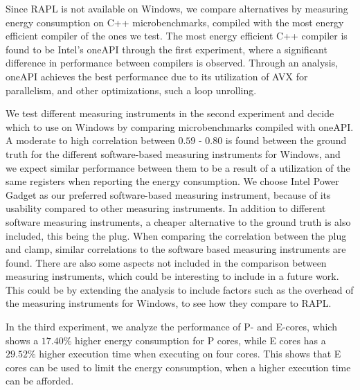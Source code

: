 Since RAPL is not available on Windows, we compare alternatives by measuring energy consumption on C++ microbenchmarks, compiled with the most energy efficient compiler of the ones we test. The most energy efficient C++ compiler is found to be Intel's oneAPI through the first experiment, where a significant difference in performance between compilers is observed. Through an analysis, oneAPI achieves the best performance due to its utilization of AVX for parallelism, and other optimizations, such a loop unrolling.


We test different measuring instruments in the second experiment and decide which to use on Windows by comparing microbenchmarks compiled with oneAPI. A moderate to high correlation between $0.59$ - $0.80$ is found between the ground truth for the different software-based measuring instruments for Windows, and we expect similar performance between them to be a result of a utilization of the same registers when reporting the energy consumption. We choose Intel Power Gadget as our preferred software-based measuring instrument, because of its usability compared to other measuring instruments. In addition to different software measuring instruments, a cheaper alternative to the ground truth is also included, this being the plug. When comparing the correlation between the plug and clamp, similar correlations to the software based measuring instruments are found. There are also some aspects not included in the comparison between measuring instruments, which could be interesting to include in a future work. This could be by extending the analysis to include factors such as the overhead of the measuring instruments for Windows, to see how they compare to RAPL.

In the third experiment, we analyze the performance of P- and E-cores, which shows a $17.40\%$ higher energy consumption for P cores, while E cores has a $29.52\%$ higher execution time when executing on four cores. This shows that E cores can be used to limit the energy consumption, when a higher execution time can be afforded.



